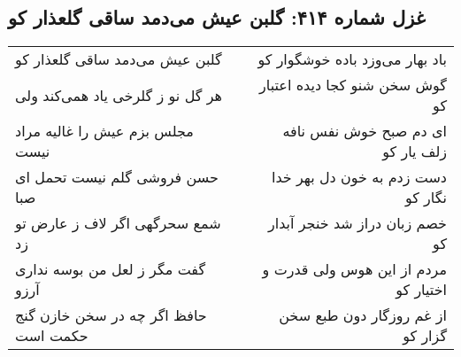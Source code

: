 \begin{center}
\section*{غزل شماره ۴۱۴: گلبن عیش می‌دمد ساقی گلعذار کو}
\label{sec:sh414}
\begin{longtable}{l p{0.5cm} r}
گلبن عیش می‌دمد ساقی گلعذار کو
&&
باد بهار می‌وزد باده خوشگوار کو
\\
هر گل نو ز گلرخی یاد همی‌کند ولی
&&
گوش سخن شنو کجا دیده اعتبار کو
\\
مجلس بزم عیش را غالیه مراد نیست
&&
ای دم صبح خوش نفس نافه زلف یار کو
\\
حسن فروشی گلم نیست تحمل ای صبا
&&
دست زدم به خون دل بهر خدا نگار کو
\\
شمع سحرگهی اگر لاف ز عارض تو زد
&&
خصم زبان دراز شد خنجر آبدار کو
\\
گفت مگر ز لعل من بوسه نداری آرزو
&&
مردم از این هوس ولی قدرت و اختیار کو
\\
حافظ اگر چه در سخن خازن گنج حکمت است
&&
از غم روزگار دون طبع سخن گزار کو
\\
\end{longtable}
\end{center}
